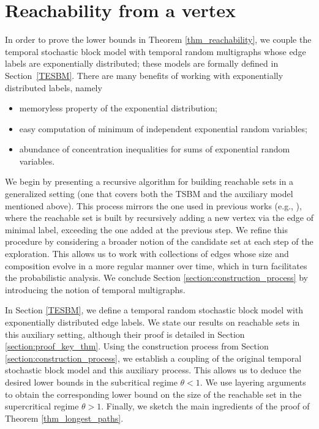 \documentclass[11pt]{article}
\numberwithin{equation}{section}
\theoremstyle{definition}
\begin{document}
\section{Reachability from a vertex}
\label{section_subcritical}

In order to prove the lower bounds in Theorem \ref{thm_reachability}, we couple the temporal stochastic block model with temporal random multigraphs whose edge labels are exponentially distributed; these models are formally defined in Section~\ref{TESBM}. There are many benefits of working with exponentially distributed labels, namely
\begin{itemize}
	\item memoryless property of the exponential distribution;
	\item easy computation of minimum of independent exponential random variables;
	\item abundance of concentration inequalities for sums of exponential random variables.
\end{itemize}  
We begin by presenting a recursive algorithm for building reachable sets in a generalized setting (one that covers both the TSBM and the auxiliary model mentioned above). This process mirrors the one used in previous works (e.g., \cite{CRRZ24,BKL24}), where the reachable set is built by recursively adding a new vertex via the edge of minimal label, exceeding the one added at the previous step. We refine this procedure by considering a broader notion of the candidate set at each step of the exploration. This allows us to work with collections of edges whose size and composition evolve in a more regular manner over time, which in turn facilitates the probabilistic analysis. We conclude Section \ref{section:construction_process} by introducing the notion of temporal multigraphs.

In Section \ref{TESBM}, we define a temporal random stochastic block model with exponentially distributed edge labels. We state our results on reachable sets in this auxiliary setting, although their proof is detailed in Section \ref{section:proof_key_thm}. Using the construction process from Section \ref{section:construction_process}, we establish a coupling of the original temporal stochastic block model and this auxiliary process. This allows us to deduce the desired lower bounds in the subcritical regime $\theta < 1$. We use layering arguments to obtain the corresponding lower bound on the size of the reachable set in the supercritical regime $\theta > 1$. Finally, we sketch the main ingredients of the proof of Theorem \ref{thm_longest_paths}.
\end{document}
